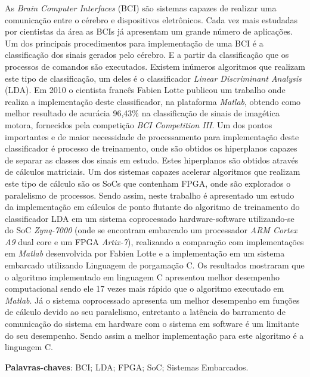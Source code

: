 \begin{resumo}

As \textit{Brain Computer Interfaces} (BCI) são sistemas capazes de realizar uma comunicação entre o cérebro e dispositivos eletrônicos. Cada vez mais estudadas por cientistas da área as BCIs já apresentam um grande número de aplicações. Um dos principais procedimentos para implementação de uma BCI é a classificação dos sinais gerados pelo cérebro. E a partir da classificação que os processos de comandos são executados. Existem inúmeros algoritmos que realizam este tipo de classificação, um deles é o classificador \textit{Linear Discriminant  Analysis} (LDA). Em 2010 o cientista francês Fabien Lotte publicou um trabalho onde realiza a implementação deste classificador, na plataforma \textit{Matlab}, obtendo como melhor resultado de acurácia 96,43\% na classificação de sinais de imagética motora, fornecidos pela competição \textit{BCI Competition III}. Um dos pontos importantes e de maior necessidade de processamento para implementação deste classificador é processo de treinamento, onde são obtidos os hiperplanos capazes de separar as classes dos sinais em estudo. Estes hiperplanos são obtidos através de cálculos matriciais. Um dos sistemas capazes acelerar algoritmos que realizam este tipo de cálculo são os SoCs que contenham FPGA, onde são explorados o paralelismo de processos.
Sendo assim, neste trabalho é apresentado um estudo da implementação em cálculos de ponto flutante do algoritmo de treinamento do classificador LDA em um sistema coprocessado hardware-software utilizando-se do SoC \textit{Zynq-7000} (onde se encontram embarcado um processador \textit{ARM Cortex A9} dual core e um FPGA \textit{Artix-7}), realizando a comparação com implementações em \textit{Matlab} desenvolvida por Fabien Lotte e a implementação em um sistema embarcado utilizando Linguagem de porgamação C. Os resultados mostraram que o algoritmo implementado em linguagem C apresentou melhor desempenho computacional sendo ele 17 vezes mais rápido que o algoritmo executado em \textit{Matlab}. Já o sistema coprocessado apresenta um melhor desempenho em funções de cálculo devido ao seu paralelismo, entretanto a latência do barramento de comunicação do sistema em hardware com o sistema em software é um limitante do seu desempenho. Sendo assim a melhor implementação para este algoritmo é a linguagem C.
 \vspace{\onelineskip}
 
 \noindent
 \textbf{Palavras-chaves}: BCI; LDA; FPGA; SoC; Sistemas Embarcados.
\end{resumo}
